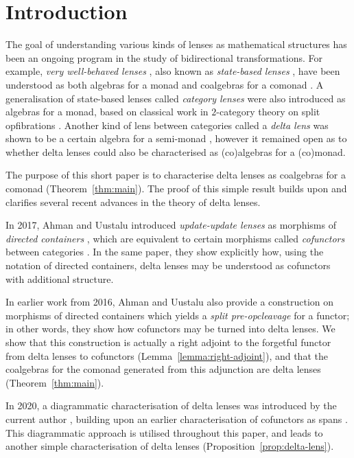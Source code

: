 \documentclass[colorlinks = true, a4paper, oneside, reqno, 11pt]{amsart}
\theoremstyle{definition}
\theoremstyle{remark}
\begin{document}
\section{Introduction}
\label{sec:introduction}

The goal of understanding various kinds of lenses as mathematical 
structures has been an ongoing program in the study of bidirectional 
transformations. 
For example, \emph{very well-behaved lenses} \cite{FGMPS07}, 
also known as \emph{state-based lenses} \cite{AU17},
have been understood as both algebras for a monad \cite{JRW10} and 
coalgebras for a comonad \cite{Con11, GJ12}.
A generalisation of state-based lenses called \emph{category lenses} 
\cite{JRW12} were also introduced as algebras for a monad, 
based on classical work in $2$-category theory on split 
opfibrations \cite{Str74}. 
Another kind of lens between categories called a \emph{delta lens} 
\cite{DXC11} was shown to be a certain algebra for a semi-monad \cite{JR13},
however it remained open as to whether delta lenses could also be 
characterised as (co)algebras for a (co)monad. 

The purpose of this short paper is to characterise delta lenses as 
coalgebras for a comonad (Theorem~\ref{thm:main}). 
The proof of this simple result builds upon and clarifies several recent 
advances in the theory of delta lenses. 

In 2017, Ahman and Uustalu introduced \emph{update-update lenses} 
\cite{AU17} as morphisms of \emph{directed containers} \cite{ACU14}, 
which are equivalent to certain morphisms called
\emph{cofunctors} between categories \cite{Agu97}.
In the same paper, they show explicitly how, using the notation of 
directed containers, delta lenses may be understood as cofunctors with 
additional structure. 

In earlier work \cite{AU16} from 2016, Ahman and Uustalu also provide a 
construction on morphisms of directed containers which yields a 
\emph{split pre-opcleavage} for a functor; in other words, they 
show how cofunctors may be turned into delta lenses. 
We show that this construction is actually a right adjoint to the 
forgetful functor from delta lenses to cofunctors (Lemma~\ref{lemma:right-adjoint}), 
and that the coalgebras for the comonad generated from this adjunction are
delta lenses (Theorem~\ref{thm:main}).   

In 2020, a diagrammatic characterisation of delta lenses was 
introduced by the current author \cite{Cla20}, building upon 
an earlier characterisation of cofunctors as spans \cite{HM93}.
This diagrammatic approach is utilised throughout this paper, 
and leads to another simple characterisation of delta lenses 
(Proposition~\ref{prop:delta-lens}). 
\end{document}
